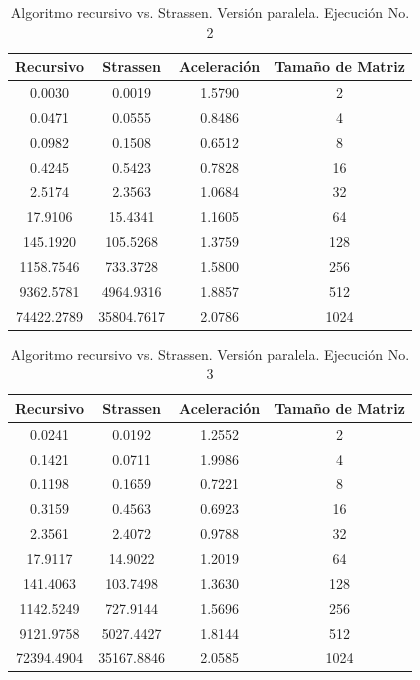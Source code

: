 \documentclass{article}
\begin{document}
\begin{table}[ht]
\centering
\begin{tabular}{|c|c|c|c|}
\hline
\textbf{Recursivo} & \textbf{Strassen} & \textbf{Aceleración} & \textbf{Tamaño de Matriz} \\
\hline
0.0030 & 0.0019 & 1.5790 & 2 \\
0.0471 & 0.0555 & 0.8486 & 4 \\
0.0982 & 0.1508 & 0.6512 & 8 \\
0.4245 & 0.5423 & 0.7828 & 16 \\
2.5174 & 2.3563 & 1.0684 & 32 \\
17.9106 & 15.4341 & 1.1605 & 64 \\
145.1920 & 105.5268 & 1.3759 & 128 \\
1158.7546 & 733.3728 & 1.5800 & 256 \\
9362.5781 & 4964.9316 & 1.8857 & 512 \\
74422.2789 & 35804.7617 & 2.0786 & 1024 \\
\hline
\end{tabular}
\caption{Algoritmo recursivo vs. Strassen. Versión paralela. Ejecución No. 2}
\end{table}

\begin{table}[ht]
\centering
\begin{tabular}{|c|c|c|c|}
\hline
\textbf{Recursivo} & \textbf{Strassen} & \textbf{Aceleración} & \textbf{Tamaño de Matriz} \\
\hline
0.0241 & 0.0192 & 1.2552 & 2 \\
0.1421 & 0.0711 & 1.9986 & 4 \\
0.1198 & 0.1659 & 0.7221 & 8 \\
0.3159 & 0.4563 & 0.6923 & 16 \\
2.3561 & 2.4072 & 0.9788 & 32 \\
17.9117 & 14.9022 & 1.2019 & 64 \\
141.4063 & 103.7498 & 1.3630 & 128 \\
1142.5249 & 727.9144 & 1.5696 & 256 \\
9121.9758 & 5027.4427 & 1.8144 & 512 \\
72394.4904 & 35167.8846 & 2.0585 & 1024 \\
\hline
\end{tabular}
\caption{Algoritmo recursivo vs. Strassen. Versión paralela. Ejecución No. 3}
\end{table}
\end{document}
